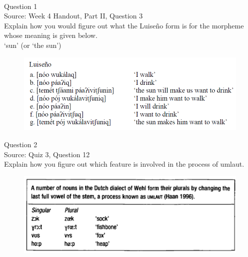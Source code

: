 \documentclass[12pt]{article}
\begin{document}
\begin{center}
\textbf{{\color{red}{\HUGE END OF EXAM}}}\\

\end{center}
\newpage

\begin{center}
\textbf{{\color{blue}{\HUGE START OF EXAM\\}}}

\textbf{{\color{blue}{\HUGE Student ID: 47906\\}}}

\textbf{{\color{blue}{\HUGE 9:10\\}}}

\end{center}
\newpage

{\large Question 1}\\

Source: Week 4 Handout, Part II, Question 3\\

Explain how you would figure out what the Luiseño form is for the morpheme whose meaning is given below.\\

‘sun’ (or ‘the sun’)

\begin{figure}[H]
\includegraphics{../images/luiseno.png}
\end{figure}

\newpage

{\large Question 2}\\

Source: Quiz 3, Question 12\\

Explain how you figure out which feature is involved in the process of umlaut.\\

\begin{figure}[H]
\includegraphics{../images/dutch.png}
\end{figure}
\end{document}
